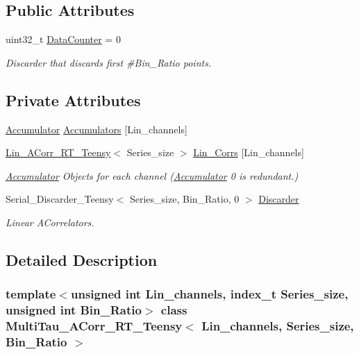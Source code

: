 \subsection*{Public Attributes}
\begin{DoxyCompactItemize}
\item 
uint32\+\_\+t \hyperlink{classMultiTau__ACorr__RT__Teensy_ac403944f1456e09036bef6dc60d5a0b2}{Data\+Counter} = 0
\begin{DoxyCompactList}\small\item\em Discarder that discards first \#\+Bin\+\_\+\+Ratio points. \end{DoxyCompactList}\end{DoxyCompactItemize}
\subsection*{Private Attributes}
\begin{DoxyCompactItemize}
\item 
\hyperlink{classAccumulator}{Accumulator} \hyperlink{classMultiTau__ACorr__RT__Teensy_a5b6f2659e905f143bc898a9b803eae24}{Accumulators} \mbox{[}Lin\+\_\+channels\mbox{]}
\item 
\hyperlink{classLin__ACorr__RT__Teensy}{Lin\+\_\+\+A\+Corr\+\_\+\+R\+T\+\_\+\+Teensy}$<$ Series\+\_\+size $>$ \hyperlink{classMultiTau__ACorr__RT__Teensy_a1dc1e665268e5774e2810b74e6dbebc4}{Lin\+\_\+\+Corrs} \mbox{[}Lin\+\_\+channels\mbox{]}
\begin{DoxyCompactList}\small\item\em \hyperlink{classAccumulator}{Accumulator} Objects for each channel (\hyperlink{classAccumulator}{Accumulator} \textquotesingle{}0\textquotesingle{} is redundant.) \end{DoxyCompactList}\item 
Serial\+\_\+\+Discarder\+\_\+\+Teensy$<$ Series\+\_\+size, Bin\+\_\+\+Ratio, 0 $>$ \hyperlink{classMultiTau__ACorr__RT__Teensy_ad216281408b0f32892d3c554ad16309e}{Discarder}
\begin{DoxyCompactList}\small\item\em Linear A\+Correlators. \end{DoxyCompactList}\end{DoxyCompactItemize}


\subsection{Detailed Description}
\subsubsection*{template$<$unsigned int Lin\+\_\+channels, index\+\_\+t Series\+\_\+size, unsigned int Bin\+\_\+\+Ratio$>$\newline
class Multi\+Tau\+\_\+\+A\+Corr\+\_\+\+R\+T\+\_\+\+Teensy$<$ Lin\+\_\+channels, Series\+\_\+size, Bin\+\_\+\+Ratio $>$}

